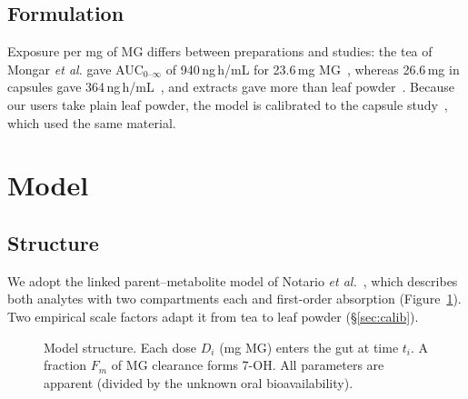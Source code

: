 \documentclass[10pt,a4paper]{article}
\begin{document}
\subsection{Formulation}
Exposure per mg of MG differs between preparations and studies: the tea of Mongar \emph{et al.} gave AUC$_{0\text{--}\infty}$
of 940\,ng\,h/mL for 23.6\,mg MG~\cite{mongar2024}, whereas 26.6\,mg in capsules gave 364\,ng\,h/mL~\cite{huestis2024}, and
extracts gave more than leaf powder~\cite{huestis2026}. Because our users take plain leaf powder, the model is calibrated to
the capsule study~\cite{huestis2024}, which used the same material.

\section{Model}

\subsection{Structure}
We adopt the linked parent--metabolite model of Notario \emph{et al.}~\cite{notario2026}, which describes both analytes with
two compartments each and first-order absorption (Figure~\ref{fig:scheme}). Two empirical scale factors adapt it from
tea to leaf powder (\S\ref{sec:calib}).

\begin{figure}[H]\centering
{}
\caption{Model structure. Each dose $D_i$ (mg MG) enters the gut at time $t_i$. A fraction $F_m$ of MG clearance forms 7-OH.
All parameters are apparent (divided by the unknown oral bioavailability).}
\label{fig:scheme}
\end{figure}
\end{document}
